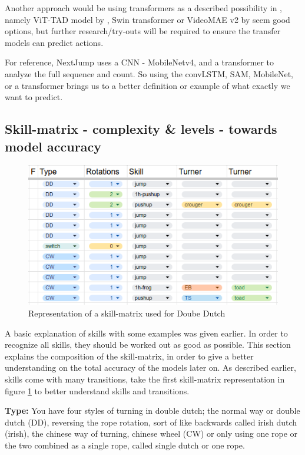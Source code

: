 Another approach would be using transformers as a described possibility in \textcite{Yin_2024}, namely ViT-TAD model by \textcite{Yang_2023}, Swin transformer \textcite{Liu_2021} or VideoMAE v2 by \textcite{Wang_2023} seem good options, but further research/try-outs will be required to ensure the transfer models can predict actions.

For reference, NextJump uses a CNN - MobileNetv4, \autocite{MobileNetv4_2024} and a transformer to analyze the full sequence and count. So using the convLSTM, SAM, MobileNet, or a transformer brings us to a better definition or example of what exactly we want to predict.


\subsection{Skill-matrix - complexity \& levels - towards model accuracy}
\label{subsec:skillcomplexiteit}

\begin{figure}
    \centering
    \includegraphics[width=0.95\linewidth]{img/doubledutch-matrix}
    \caption[skill-matrix-DD]{Representation of a skill-matrix used for Doube Dutch}
    \label{fig:doubledutch-skill-matrix}
\end{figure}

A basic explanation of skills with some examples was given earlier. In order to recognize all skills, they should be worked out as good as possible. This section explains the composition of the skill-matrix, in order to give a better understanding on the total accuracy of the models later on. As described earlier, skills come with many transitions, take the first skill-matrix representation in figure \ref{fig:doubledutch-skill-matrix} to better understand skills and transitions.

\textbf{Type:} You have four styles of turning in double dutch; the normal way or double dutch (DD), reversing the rope rotation, sort of like backwards called irish dutch (irish), the chinese way of turning, chinese wheel (CW) or only using one rope or the two combined as a single rope, called single dutch or one rope.

